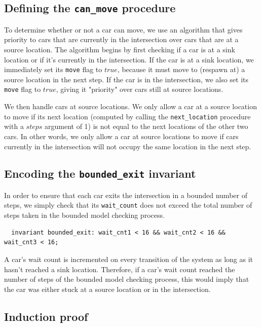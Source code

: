 \documentclass{article}
\newcommand{\code}[1]{\texttt{#1}}
\begin{document}
\subsection{Defining the \code{can\_move} procedure}

To determine whether or not a car can move, we use an algorithm that gives priority to cars that are currently in the intersection over cars that are at a source location. The algorithm begins by first checking if a car is at a sink location or if it's currently in the intersection. If the car is at a sink location, we immediately set its \code{move} flag to $true$, because it must move to (respawn at) a source location in the next step. If the car is in the intersection, we also set its \code{move} flag to $true$, giving it "priority" over cars still at source locations.

We then handle cars at source locations. We only allow a car at a source location to move if its next location (computed by calling the \code{next\_location} procedure with a $steps$ argument of 1) is not equal to the next locations of the other two cars. In other words, we only allow a car at source locations to move if cars currently in the intersection will not occupy the same location in the next step.

\subsection{Encoding the \code{bounded\_exit} invariant}

In order to ensure that each car exits the intersection in a bounded number of steps, we simply check that its \code{wait\_count} does not exceed the total number of steps taken in the bounded model checking process.

\begin{lstlisting}
  invariant bounded_exit: wait_cnt1 < 16 && wait_cnt2 < 16 && wait_cnt3 < 16;
\end{lstlisting}

A car's wait count is incremented on every transition of the system as long as it hasn't reached a sink location. Therefore, if a car's wait count reached the number of steps of the bounded model checking process, this would imply that the car was either stuck at a source location or in the intersection.

\subsection{Induction proof}
\end{document}

